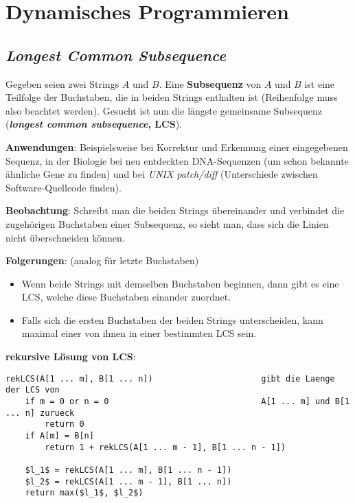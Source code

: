 \chapter{%
    Dynamisches Programmieren%
}

\section{%
    \emph{Longest Common Subsequence}%
}

Gegeben seien zwei Strings $A$ und $B$.
Eine \textbf{Subsequenz} von $A$ und $B$ ist eine Teilfolge der Buchstaben, die
in beiden Strings enthalten ist (Reihenfolge muss also beachtet werden).
Gesucht ist nun die längste gemeinsame Subsequenz
(\textbf{\emph{longest common subsequence}, LCS}).

\textbf{Anwendungen}:
Beispielsweise bei Korrektur und Erkennung einer eingegebenen Sequenz,
in der Biologie bei neu entdeckten DNA-Sequenzen (um schon bekannte ähnliche
Gene zu finden) und bei \emph{UNIX patch/diff}
(Unterschiede zwischen Software-Quellcode finden).

\linie

\textbf{Beobachtung}:
Schreibt man die beiden Strings übereinander und verbindet die zugehörigen
Buchstaben einer Subsequenz, so sieht man, dass sich die Linien nicht
überschneiden können.

\textbf{Folgerungen}:
(analog für letzte Buchstaben)
\begin{itemize}
    \item
    Wenn beide Strings mit demselben Buchstaben beginnen, dann gibt es eine
    LCS, welche diese Buchstaben einander zuordnet.

    \item
    Falls sich die ersten Buchstaben der beiden Strings unterscheiden,
    kann maximal einer von ihnen in einer bestimmten LCS sein.
\end{itemize}

\linie

\textbf{rekursive Lösung von LCS}:
\begin{lstlisting}
rekLCS(A[1 ... m], B[1 ... n])                      gibt die Laenge der LCS von
    if m = 0 or n = 0                               A[1 ... m] und B[1 ... n] zurueck
        return 0
    if A[m] = B[n]
        return 1 + rekLCS(A[1 ... m - 1], B[1 ... n - 1])

    $l_1$ = rekLCS(A[1 ... m], B[1 ... n - 1])
    $l_2$ = rekLCS(A[1 ... m - 1], B[1 ... n])
    return max($l_1$, $l_2$)
\end{lstlisting}

